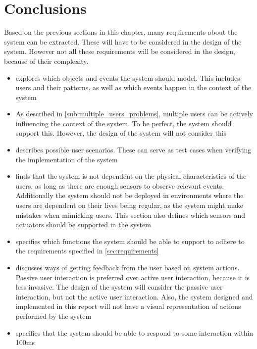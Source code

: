 \section{Conclusions}

Based on the previous sections in this chapter, many requirements about the system can be extracted. These will have to be considered in the design of the system. However not all these requirements will be considered in the design, because of their complexity. 

\begin{itemize}
\item {} explores which objects and events the system should model. This includes users and their patterns, as well as which events happen in the context of the system
\item As described in \cref{sub:multiple_users_problems}, multiple users can be actively influencing the context of the system. To be perfect, the system should support this. However, the design of the system will not consider this
\item {} describes possible user scenarios. These can serve as test cases when verifying the implementation of the system
\item {} finds that the system is not dependent on the physical characteristics of the users, as long as there are enough sensors to observe relevant events. Additionally the system should not be deployed in environments where the users are dependent on their lives being regular, as the system might make mistakes when mimicking users. This section also defines which sensors and actuators should be supported in the system
\item {} specifies which functions the system should be able to support to adhere to the requirements specified in \cref{sec:requirements}
\item {} discusses ways of getting feedback from the user based on system actions. Passive user interaction is preferred over active user interaction, because it is less invasive. The design of the system will consider the passive user interaction, but not the active user interaction. Also, the system designed and implemented in this report will not have a visual representation of actions performed by the system
\item {} specifies that the system should be able to respond to some interaction within 100ms
\end{itemize}
